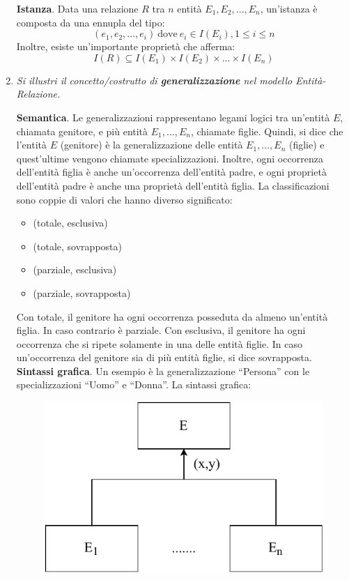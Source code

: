 \documentclass[a4paper]{article}
\newcommand{\dquotes}[1]{``#1''}
\begin{document}
\begin{enumerate}
		\noindent
		\textbf{Istanza}. Data una relazione $R$ tra $n$ entità $E_{1}, E_{2}, ..., E_{n}$, un'istanza è composta da una ennupla del tipo:
		\begin{equation*}
			\left(e_{1}, e_{2}, ..., e_{i}\right) \: \text{dove} \: e_{i} \in I\left(E_{i}\right), 1 \le i \le n
		\end{equation*}
		Inoltre, esiste un'importante proprietà che afferma:
		\begin{equation*}
			I\left(R\right) \subseteq I\left(E_{1}\right) \times I\left(E_{2}\right) \times ... \times I\left(E_{n}\right)
		\end{equation*}
		\newpage
		
		
		\item \textcolor{Green4}{\emph{Si illustri il concetto/costrutto di \textbf{generalizzazione} nel modello Entità-Relazione.}}
		
		\textbf{Semantica}. Le generalizzazioni rappresentano legami logici tra un'entità $E$, chiamata genitore, e più entità $E_{1}, ..., E_{n}$, chiamate figlie. Quindi, si dice che l'entità $E$ (genitore) è la generalizzazione delle entità $E_{1},...,E_{n}$ (figlie) e quest'ultime vengono chiamate specializzazioni. Inoltre, ogni occorrenza dell'entità figlia è anche un'occorrenza dell'entità padre, e ogni proprietà dell'entità padre è anche una proprietà dell'entità figlia.\newline
		La classificazioni sono coppie di valori che hanno diverso significato:
		\begin{itemize}
			\item (totale, esclusiva)
			
			\item (totale, sovrapposta)
			
			\item (parziale, esclusiva)
			
			\item (parziale, sovrapposta)
		\end{itemize}
		Con totale, il genitore ha ogni occorrenza posseduta da almeno un'entità figlia. In caso contrario è parziale.\newline
		Con esclusiva, il genitore ha ogni occorrenza che si ripete solamente in una delle entità figlie. In caso un'occorrenza del genitore sia di più entità figlie, si dice sovrapposta.\newline
		\textbf{Sintassi grafica}. Un esempio è la generalizzazione \dquotes{Persona} con le specializzazioni \dquotes{Uomo} e \dquotes{Donna}. La sintassi grafica:
		\begin{figure}[!htp]
			\centering
			\includegraphics[width=.5\textwidth]{img/generalizzazione_sintassi.pdf}
		\end{figure}
		\newpage
		

\end{enumerate}
\end{document}
